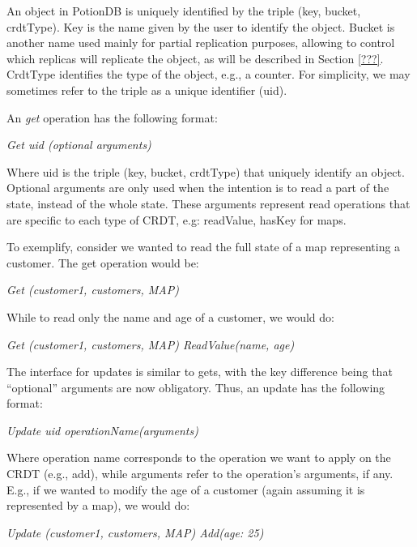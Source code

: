 \documentclass{vldb}
\newcommand{\emphvspace}{0.5\baselineskip}
\newcommand{\lineemph}[1]{\vspace{\emphvspace}\hspace{2em}\emph{#1}\vspace{\emphvspace}}
\begin{document}
An object in PotionDB is uniquely identified by the triple (key, bucket, crdtType).
Key is the name given by the user to identify the object. Bucket is another name used mainly for partial replication purposes, allowing to control which replicas will replicate the object, as will be described in Section \ref{???}.
CrdtType identifies the type of the object, e.g., a counter.
For simplicity, we may sometimes refer to the triple as a unique identifier (uid).

An \emph{get} operation has the following format:

\lineemph{Get uid (optional arguments)}

Where uid is the triple (key, bucket, crdtType) that uniquely identify an object.
Optional arguments are only used when the intention is to read a part of the state, instead of the whole state.
These arguments represent read operations that are specific to each type of CRDT, e.g: readValue, hasKey for maps.

To exemplify, consider we wanted to read the full state of a map representing a customer. The get operation would be:

\lineemph{Get (customer1, customers, MAP)}

While to read only the name and age of a customer, we would do:

\lineemph{Get (customer1, customers, MAP) ReadValue(name, age)}

The interface for updates is similar to gets, with the key difference being that ``optional'' arguments are now obligatory.
Thus, an update has the following format:

\lineemph{Update uid operationName(arguments)}

Where operation name corresponds to the operation we want to apply on the CRDT (e.g., add), while arguments refer to the operation's arguments, if any.
E.g., if we wanted to modify the age of a customer (again assuming it is represented by a map), we would do:

\lineemph{Update (customer1, customers, MAP) Add({age: 25})}


\end{document}
